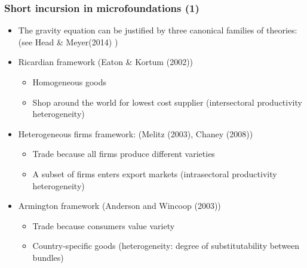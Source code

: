 \documentclass{beamer}
\begin{document}
\begin{frame}[plain]\frametitle{Short incursion in microfoundations (1)}
\begin{itemize}
\item The gravity equation can be justified by three canonical families of theories: (see Head \& Meyer(2014) )
\item Ricardian framework (Eaton \& Kortum (2002))
	\begin{itemize}
	\item Homogeneous goods
	\item Shop around the world for lowest cost supplier (intersectoral productivity heterogeneity)
	\end{itemize}
\item Heterogeneous firms framework: (Melitz (2003),  Chaney (2008))
	\begin{itemize}
	\item Trade because all firms produce different varieties
	\item A subset of firms enters export markets (intrasectoral productivity heterogeneity)
	\end{itemize}
\item Armington framework (Anderson and Wincoop (2003))
	\begin{itemize}
	\item Trade because consumers value variety 
	\item Country-specific goods (heterogeneity: degree of substitutability between bundles)
	\end{itemize}
\end{itemize}
\end{frame}
\end{document}
